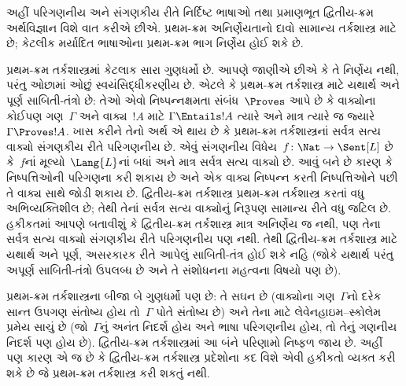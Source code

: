 \begingroup
\makeatletter{}\makeatother


\label{guunit:OLP-0331}


અહીં પરિગણનીય અને સંગણકીય રીતે નિર્દિષ્ટ ભાષાઓ તથા પ્રમાણભૂત
દ્વિતીય-ક્રમ અર્થવિજ્ઞાન વિશે વાત કરીએ છીએ. પ્રથમ-ક્રમ
અનિર્ણેયતાનો દાવો સામાન્ય તર્કશાસ્ત્ર માટે છે; કેટલીક મર્યાદિત
ભાષાઓના પ્રથમ-ક્રમ ભાગ નિર્ણેય હોઈ શકે છે.

પ્રથમ-ક્રમ તર્કશાસ્ત્રમાં કેટલાક સારા ગુણધર્મો છે. આપણે જાણીએ છીએ કે
તે નિર્ણેય નથી, પરંતુ ઓછામાં ઓછું સ્વયંસિદ્ધીકરણીય છે. એટલે કે
પ્રથમ-ક્રમ તર્કશાસ્ત્ર માટે યથાર્થ અને પૂર્ણ સાબિતી-તંત્રો છે: તેઓ
એવો નિષ્પન્નક્ષમતા સંબંધ~$\Proves$ આપે છે કે વાક્યોના કોઈપણ
ગણ~$\Gamma$ અને વાક્ય~$!A$ માટે $\Gamma \Entails !A$ ત્યારે અને માત્ર
ત્યારે જ જ્યારે $\Gamma \Proves !A$. ખાસ કરીને તેનો અર્થ એ થાય છે કે
પ્રથમ-ક્રમ તર્કશાસ્ત્રનાં સર્વત્ર સત્ય વાક્યો સંગણકીય રીતે પરિગણનીય છે. એવું સંગણનીય વિધેય~$f\colon \Nat \to
\Sent[L]$ છે કે~$f$નાં મૂલ્યો~$\Lang{L}$નાં બધાં અને માત્ર સર્વત્ર સત્ય
વાક્યો છે. આવું બને છે કારણ કે નિષ્પત્તિઓની પરિગણના
કરી શકાય છે અને એક વાક્ય નિષ્પન્ન કરતી નિષ્પત્તિઓને પછી
તે વાક્ય સાથે જોડી શકાય છે. દ્વિતીય-ક્રમ તર્કશાસ્ત્ર
પ્રથમ-ક્રમ તર્કશાસ્ત્ર કરતાં વધુ અભિવ્યક્તિશીલ છે; તેથી તેનાં
સર્વત્ર સત્ય વાક્યોનું નિરૂપણ સામાન્ય રીતે વધુ જટિલ છે. હકીકતમાં આપણે
બતાવીશું કે દ્વિતીય-ક્રમ તર્કશાસ્ત્ર માત્ર અનિર્ણેય જ નથી, પણ તેના
સર્વત્ર સત્ય વાક્યો સંગણકીય રીતે પરિગણનીય પણ નથી. તેથી દ્વિતીય-ક્રમ તર્કશાસ્ત્ર માટે યથાર્થ અને
પૂર્ણ, અસરકારક રીતે આપેલું સાબિતી-તંત્ર હોઈ શકે નહિ
(જોકે યથાર્થ પરંતુ અપૂર્ણ સાબિતી-તંત્રો
ઉપલબ્ધ છે અને તે સંશોધનના મહત્વના વિષયો પણ છે).

પ્રથમ-ક્રમ તર્કશાસ્ત્રના બીજા બે ગુણધર્મો પણ છે: તે સઘન છે (વાક્યોના
ગણ~$\Gamma$નો દરેક સાન્ત ઉપગણ સંતોષ્ય હોય તો~$\Gamma$ પોતે સંતોષ્ય
છે) અને તેના માટે લેવેનહાઇમ--સ્કોલેમ પ્રમેય સાચું છે (જો~$\Gamma$નું
અનંત નિદર્શ હોય અને ભાષા પરિગણનીય હોય, તો તેનું
ગણનીય નિદર્શ પણ હોય છે).
દ્વિતીય-ક્રમ તર્કશાસ્ત્રમાં આ બંને પરિણામો નિષ્ફળ જાય છે. અહીં પણ
કારણ એ જ છે કે દ્વિતીય-ક્રમ તર્કશાસ્ત્ર પ્રદેશોના કદ વિશે એવી
હકીકતો વ્યક્ત કરી શકે છે જે પ્રથમ-ક્રમ તર્કશાસ્ત્ર કરી શકતું નથી.
\endgroup


\begingroup
\makeatletter{}\makeatother

